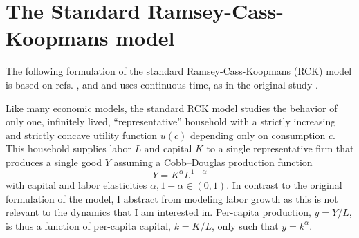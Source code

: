 \section{The Standard Ramsey-Cass-Koopmans model}
\label{sec:savings_standard_rck}

The following formulation of the standard Ramsey-Cass-Koopmans (RCK) model is based on refs. \cite[p. 287--317]{Acemoglu2009}, \cite[p. 85--135]{Barro2004}  and \cite[p. 38--90]{Blanchard1989} and uses continuous time, as in the original study \citep{Ramsey1928}.

Like many economic models, the standard RCK model studies the behavior of only one, infinitely lived, ``representative'' household with a strictly increasing and strictly concave utility function $u(c)$ depending only on consumption $c$. This household supplies labor $L$ and capital $K$ to a single representative firm that produces a single good $Y$ assuming a Cobb--Douglas production function
\begin{equation}
  Y \! =\! K^\alpha L^{1-\alpha}\label{eq:CD-Production}
\end{equation} 
with capital and labor elasticities $\alpha, 1 \!- \! \alpha \in (0,1)$.
In contrast to the original formulation of the model, I abstract from modeling labor growth as this is not relevant to the dynamics that I am interested in.
Per-capita production, $y \! =\! Y/L$, is thus a function of per-capita capital, $k \! =\! K/L$, only such that $y \! =\! k^\alpha$.

